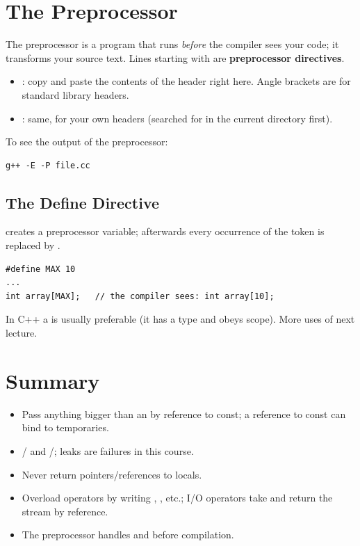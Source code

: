 \section{The Preprocessor}
The preprocessor is a program that runs \emph{before} the compiler sees your
code; it transforms your source text. Lines starting with \code{\#} are
\textbf{preprocessor directives}.
\begin{itemize}
  \item {}: copy and paste the contents of the header right
        here. Angle brackets are for standard library headers.
  \item {}: same, for your own headers (searched for in
        the current directory first).
\end{itemize}
To see the output of the preprocessor:
\begin{lstlisting}[style=bash]
g++ -E -P file.cc
\end{lstlisting}

\subsection{The Define Directive}
 creates a preprocessor variable; afterwards every
occurrence of the token  is replaced by .
\begin{lstlisting}[style=cpp]
#define MAX 10
...
int array[MAX];   // the compiler sees: int array[10];
\end{lstlisting}
In C++ a  is usually preferable (it has a type and
obeys scope). More uses of  next lecture.

\section*{Summary}
\begin{itemize}
  \item Pass anything bigger than an  by reference to const; a
        reference to const can bind to temporaries.
  \item {}/ and /; leaks are
        failures in this course.
  \item Never return pointers/references to locals.
  \item Overload operators by writing , , etc.;
        I/O operators take and return the stream by reference.
  \item The preprocessor handles  and  before
        compilation.
\end{itemize}
